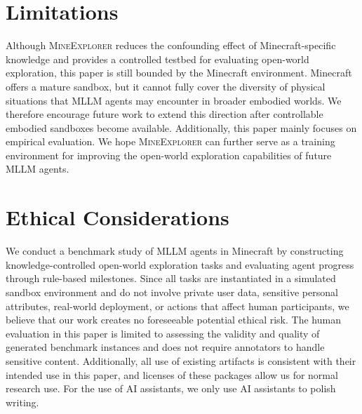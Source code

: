 \documentclass[11pt]{article}
\begin{document}
\section*{Limitations}

Although \textsc{MineExplorer} reduces the confounding effect of Minecraft-specific knowledge and provides a controlled testbed for evaluating open-world exploration, this paper is still bounded by the Minecraft environment. 
Minecraft offers a mature sandbox, but it cannot fully cover the diversity of physical situations that MLLM agents may encounter in broader embodied worlds. 
We therefore encourage future work to extend this direction after controllable embodied sandboxes become available. 
Additionally, this paper mainly focuses on empirical evaluation. 
We hope \textsc{MineExplorer} can further serve as a training environment for improving the open-world exploration capabilities of future MLLM agents.

\section*{Ethical Considerations}

We conduct a benchmark study of MLLM agents in Minecraft by constructing knowledge-controlled open-world exploration tasks and evaluating agent progress through rule-based milestones. 
Since all tasks are instantiated in a simulated sandbox environment and do not involve private user data, sensitive personal attributes, real-world deployment, or actions that affect human participants, we believe that our work creates no foreseeable potential ethical risk. 
The human evaluation in this paper is limited to assessing the validity and quality of generated benchmark instances and does not require annotators to handle sensitive content. 
Additionally, all use of existing artifacts is consistent with their intended use in this paper, and licenses of these packages allow us for normal research use. 
For the use of AI assistants, we only use AI assistants to polish writing.



%

\end{document}
